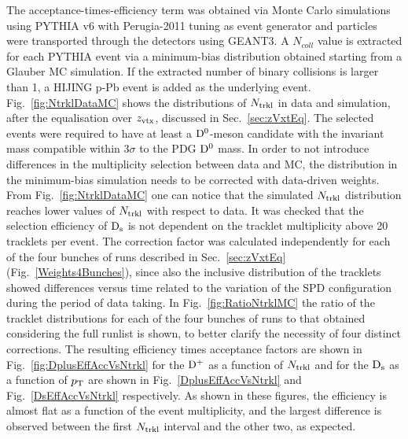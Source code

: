 The acceptance-times-efficiency term was obtained via Monte Carlo simulations
using PYTHIA v6 with Perugia-2011 tuning as event generator and 
particles were transported through the detectors using GEANT3.
A $N_{coll}$ value is extracted for each PYTHIA event via a minimum-bias 
distribution obtained starting from a Glauber MC simulation. If the 
extracted number of binary collisions is larger than 1, a HIJING p-Pb 
event is added as the underlying event. 
Fig.~\ref{fig:NtrklDataMC} shows the distributions of $N_{\rm trkl}$ in data and simulation,
after the equalisation over $z_{\rm vtx}$, discussed in Sec.~\ref{sec:zVxtEq}. 
The selected events were required to have at least a ${\rm D^0}$-meson candidate 
with the invariant mass compatible within 3$\sigma$ to the PDG ${\rm D^0}$ mass. 
In order to not introduce differences in the multiplicity selection between data and MC, 
the distribution in the minimum-bias simulation needs to be corrected
with data-driven weights. From Fig.~\ref{fig:NtrklDataMC} one 
can notice that the simulated $N_{\rm trkl}$ distribution reaches
lower values of $N_{\rm trkl}$ with respect to data. It was checked 
that the selection efficiency of ${\rm D_s}$ is not dependent on
the tracklet multiplicity above 20 tracklets per event.
The correction factor was calculated independently for each of the 
four bunches of runs described in Sec.~\ref{sec:zVxtEq} (Fig.~\ref{Weights4Bunches}),
since also the inclusive distribution of the tracklets showed differences 
versus time related to the variation of the SPD configuration during the
period of data taking. In Fig.~\ref{fig:RatioNtrklMC} 
the ratio of the tracklet distributions for each of the four bunches
of runs to that obtained considering the full runlist is shown, to 
better clarify the necessity of four distinct corrections.
The resulting efficiency times acceptance factors are shown in 
Fig.~\ref{fig:DplusEffAccVsNtrkl} for the ${\rm D^+}$ as a function of 
$N_{\rm trkl}$ and for the ${\rm D_s}$ as a function of $p_{\rm T}$ are shown 
in Fig.~\ref{DplusEffAccVsNtrkl} and Fig.~\ref{DsEffAccVsNtrkl} 
respectively. As shown in these figures, the efficiency is almost flat 
as a function of the event multiplicity, and the largest difference is 
observed between the first $N_{\rm trkl}$ interval and the other two, as expected.


